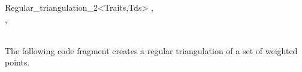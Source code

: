 \begin{ccRefClass}{Regular_triangulation_2<Traits,Tds>}
\ccSeeAlso
{}, \\
, \\
 \\


\ccExample
The following code fragment creates a regular triangulation 
of a set of weighted points.


\end{ccRefClass}


